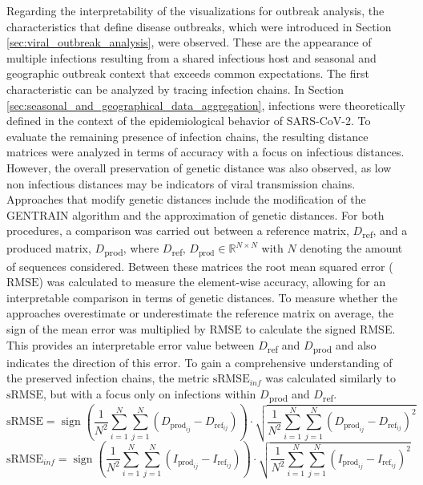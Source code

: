 Regarding the interpretability of the visualizations for outbreak analysis, the characteristics that define disease outbreaks, which were introduced in Section \ref{sec:viral_outbreak_analysis}, were observed. These are the appearance of multiple infections resulting from a shared infectious host and seasonal and geographic outbreak context that exceeds common expectations. The first characteristic can be analyzed by tracing infection chains. In Section \ref{sec:seasonal_and_geographical_data_aggregation}, infections were theoretically defined in the context of the epidemiological behavior of SARS-CoV-2. To evaluate the remaining presence of infection chains, the resulting distance matrices were analyzed in terms of accuracy with a focus on infectious distances. However, the overall preservation of genetic distance was also observed, as low non infectious distances may be indicators of viral transmission chains. Approaches that modify genetic distances include the modification of the GENTRAIN algorithm and the approximation of genetic distances. For both procedures, a comparison was carried out between a reference matrix, $D$\textsubscript{ref}, and a produced matrix, $D$\textsubscript{prod}, where $D$\textsubscript{ref}, $D_{\text{prod}} \in \mathbb{R}^{N \times N}$ with $N$ denoting the amount of sequences considered. Between these matrices the root mean squared error ($\text{RMSE}$) was calculated to measure the element-wise accuracy, allowing for an interpretable comparison in terms of genetic distances. To measure whether the approaches overestimate or underestimate the reference matrix on average, the sign of the mean error was multiplied by $\text{RMSE}$ to calculate the signed RMSE. This provides an interpretable error value between $D$\textsubscript{ref} and $D$\textsubscript{prod} and also indicates the direction of this error. To gain a comprehensive understanding of the preserved infection chains, the metric $\text{sRMSE}_{inf}$ was calculated similarly to $\text{sRMSE}$, but with a focus only on infections within $D$\textsubscript{prod} and $D$\textsubscript{ref}. 
$$\text{sRMSE} = \operatorname{sign}\left( \frac{1}{N^2} \sum_{i=1}^{N} \sum_{j=1}^{N} (D_{\text{prod}_{ij}} - D_{\text{ref}_{ij}}) \right) \cdot \sqrt{ \frac{1}{N^2} \sum_{i=1}^{N} \sum_{j=1}^{N} (D_{\text{prod}_{ij}} - D_{\text{ref}_{ij}})^2 }$$
$$\text{sRMSE}_{inf} = \operatorname{sign}\left( \frac{1}{N^2} \sum_{i=1}^{N} \sum_{j=1}^{N} (I_{\text{prod}_{ij}} - I_{\text{ref}_{ij}}) \right) \cdot \sqrt{ \frac{1}{N^2} \sum_{i=1}^{N} \sum_{j=1}^{N} (I_{\text{prod}_{ij}} - I_{\text{ref}_{ij}})^2 }$$

